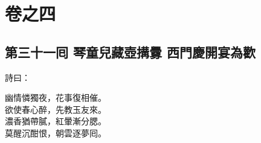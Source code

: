 \part*{{\titlename}卷之四}



\chapter*{第三十一囘 琴童兒藏壺搆釁 西門慶開宴為歡}


詩曰：

\begin{myquote}
幽情憐獨夜，花事復相催。\\欲使春心醉，先教玉友來。\\濃香猶帶膩，紅暈漸分腮。\\莫醒沉酣恨，朝雲逐夢囘。
\end{myquote}

